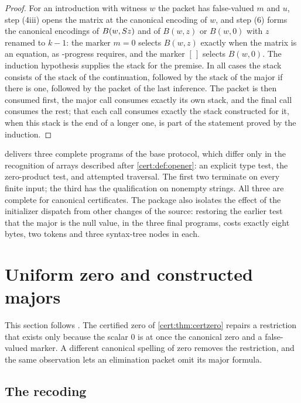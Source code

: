 \begin{proof}
For an introduction with witness $w$ the packet has false-valued $m$ and $u$,
step (4iii) opens the matrix at the canonical encoding of $w$, and step (6)
forms the canonical encodings of $B(w,S z)$ and of $B(w,z)$ or $B(w,0)$
with $z$ renamed to $k-1$: the marker $m=0$ selects $B(w,z)$ exactly when the
matrix is an equation, as -progress requires, and the marker
$[\,]$ selects $B(w,0)$. The induction hypothesis supplies the stack for the
premise. In all cases the stack consists of the stack of the continuation,
followed by the stack of the major if there is one, followed by the packet of
the last inference. The packet is then consumed first, the major call consumes
exactly its own stack, and the final call consumes the rest; that each call
consumes exactly the stack constructed for it, when this stack is the end of a
longer one, is part of the statement proved by the induction.
\end{proof}

\begin{remark}[Profiles]\label{cert:rem:base-profiles}
 delivers three complete programs of the base protocol,
which differ only in the recognition of arrays described after
\cref{cert:def:opener}: an explicit type test, the zero-product test, and
attempted traversal. The first two terminate on every finite input; the third
has the qualification on nonempty strings. All three are complete for
canonical certificates. The package also isolates the effect of the
initializer dispatch from other changes of the source: restoring the earlier
test that the major is the null value, in the three final programs, costs
exactly eight bytes, two tokens and three syntax-tree nodes in each.
\end{remark}

\section{Uniform zero and constructed majors}\label{cert:sec:uzero}

This section follows . The certified zero of
\cref{cert:thm:certzero} repairs a restriction that exists only because the
scalar $0$ is at once the canonical zero and a false-valued marker. A
different canonical spelling of zero removes the restriction, and the same
observation lets an elimination packet omit its major formula.

\subsection{The recoding}

